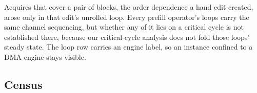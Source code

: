 Acquires that cover a pair of blocks, the order dependence a hand edit created, arose only in that edit's unrolled loop.
Every prefill operator's loops carry the same channel sequencing, but whether any of it lies on a critical cycle is not established there, because our critical-cycle analysis does not fold those loops' steady state.
The loop row carries an engine label, so an instance confined to a DMA engine stays visible.

\subsection{Census}
\label{subsec:census}

